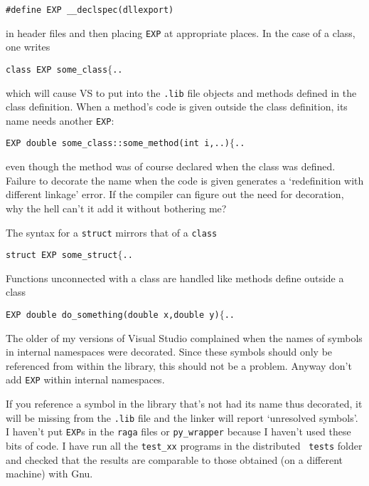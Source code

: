 {\tt\#define EXP \_\_declspec(dllexport)} 

\noindent in header files and then placing {\tt EXP} at
appropriate places. In the case of a class, one writes

{\tt class EXP some\_class$\{$..}

\noindent which will cause VS to put into the {\tt.lib} file objects and methods defined
in the class definition. When a method's code is given outside the class definition, its name needs
another {\tt EXP}:

{\tt EXP double some\_class::some\_method(int i,..)$\{$..}

\noindent even though the method was of course declared when the class was defined.
Failure to decorate the name when the code is given generates a `redefinition with
different linkage' error. If the compiler can figure out the need for decoration, why the
hell can't it add it without bothering me?

\noindent The syntax for a {\tt struct} mirrors that of a {\tt class}

{\tt struct EXP some\_struct$\{$..}

\noindent Functions unconnected with a class are handled like methods define outside a
class

{\tt EXP double do\_something(double x,double y)$\{$..}

\noindent The older of my versions of Visual Studio complained when the names of symbols in internal
namespaces were decorated. Since these symbols should only be referenced from within the
library, this should not be a problem. Anyway don't add {\tt EXP} within internal
namespaces.

If you reference a symbol in the library that's not had its name thus decorated,
it will be missing from the {\tt.lib} file and the linker will report `unresolved symbols'. 
I haven't put {\tt EXP}s in the {\tt raga} files or {\tt py\_wrapper} because I haven't
used these bits of code. I have run all the {\tt test\_xx} programs in the distributed {\tt
tests} folder and checked that the results are comparable to those obtained (on a
different machine) with Gnu.

\bsk
{}

\bye 